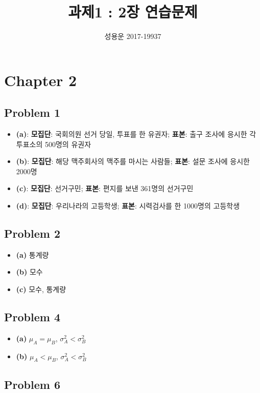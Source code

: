 \documentclass{article}
\title{과제1 : 2장 연습문제}
\author{성용운 2017-19937}
\date{}
\begin{document}
\maketitle

\section*{Chapter 2}

\subsection*{Problem 1}

\begin{itemize}
	\item \textbf{(a)}: \textbf{모집단}: 국회의원 선거 당일, 투표를 한 유권자; \textbf{표본}: 출구 조사에 응시한 각 투표소의 500명의 유권자
	\item \textbf{(b)}: \textbf{모집단}: 해당 맥주회사의 맥주를 마시는 사람들; \textbf{표본}: 설문 조사에 응시한 2000명
	\item \textbf{(c)}: \textbf{모집단}: 선거구민; \textbf{표본}: 편지를 보낸 361명의 선거구민
	\item \textbf{(d)}: \textbf{모집단}: 우리나라의 고등학생; \textbf{표본}: 시력검사를 한 1000명의 고등학생
\end{itemize}

\subsection*{Problem 2}

\begin{itemize}
	\item \textbf{(a)} 통계량
	\item \textbf{(b)} 모수
	\item \textbf{(c)} 모수, 통계량
\end{itemize}

\subsection*{Problem 4}

\begin{itemize}
	\item \textbf{(a)} $\mu_A = \mu_B$, $\sigma^2_A < \sigma^2_B$
	\item \textbf{(b)} $\mu_A < \mu_B$, $\sigma^2_A < \sigma^2_B$
\end{itemize}

\subsection*{Problem 6}
\end{document}
